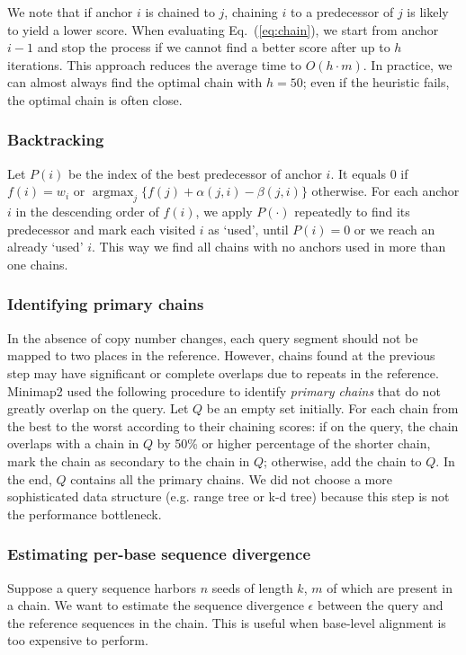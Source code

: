 \documentclass{bioinfo}
\DeclareMathOperator*{\argmax}{argmax}
\begin{document}
\begin{methods}
We note that if anchor $i$ is chained to $j$, chaining $i$ to a predecessor
of $j$ is likely to yield a lower score. When evaluating Eq.~(\ref{eq:chain}),
we start from anchor $i-1$ and stop the process if we cannot find a better
score after up to $h$ iterations. This approach reduces the average time to
$O(h\cdot m)$. In practice, we can almost always find the optimal chain with
$h=50$; even if the heuristic fails, the optimal chain is often close.

\subsubsection{Backtracking}
Let $P(i)$ be the index of the best predecessor of anchor $i$. It equals 0 if
$f(i)=w_i$ or $\argmax_j\{f(j)+\alpha(j,i)-\beta(j,i)\}$ otherwise. For each
anchor $i$ in the descending order of $f(i)$, we apply $P(\cdot)$ repeatedly to
find its predecessor and mark each visited $i$ as `used', until $P(i)=0$ or we
reach an already `used' $i$. This way we find all chains with no anchors used
in more than one chains.

\subsubsection{Identifying primary chains}\label{sec:primary}
In the absence of copy number changes, each query segment should not be mapped
to two places in the reference. However, chains found at the previous step may
have significant or complete overlaps due to repeats in the reference.
Minimap2 used the following procedure to identify \emph{primary chains} that do
not greatly overlap on the query. Let $Q$ be an empty set initially. For each
chain from the best to the worst according to their chaining scores: if on the
query, the chain overlaps with a chain in $Q$ by 50\% or higher percentage of
the shorter chain, mark the chain as secondary to the chain in $Q$; otherwise,
add the chain to $Q$. In the end, $Q$ contains all the primary chains. We did
not choose a more sophisticated data structure (e.g. range tree or k-d tree)
because this step is not the performance bottleneck.

\subsubsection{Estimating per-base sequence divergence}
Suppose a query sequence harbors $n$ seeds of length $k$, $m$ of which are
present in a chain. We want to estimate the sequence divergence $\epsilon$
between the query and the reference sequences in the chain. This is useful
when base-level alignment is too expensive to perform.


\end{methods}
\end{document}
